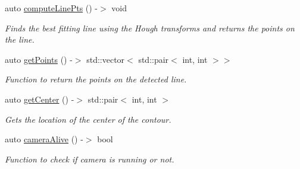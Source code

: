 \begin{DoxyCompactItemize}
auto \hyperlink{class_perception_module_a85bf112d0310cbc6a3160e3ea24f201e}{compute\+Line\+Pts} () -\/$>$ void
\begin{DoxyCompactList}\small\item\em Finds the best fitting line using the Hough transforms and returns the points on the line. \end{DoxyCompactList}\item 
auto \hyperlink{class_perception_module_a4479a449ea05c5490a47224767a864cc}{get\+Points} () -\/$>$ std\+::vector$<$ std\+::pair$<$ int, int $>$$>$
\begin{DoxyCompactList}\small\item\em Function to return the points on the detected line. \end{DoxyCompactList}\item 
auto \hyperlink{class_perception_module_ab39e9908fda8dd1b582b33a2f1ee0638}{get\+Center} () -\/$>$ std\+::pair$<$ int, int $>$
\begin{DoxyCompactList}\small\item\em Gets the location of the center of the contour. \end{DoxyCompactList}\item 
auto \hyperlink{class_perception_module_a034e0b3191be67f571aa284e0c30f749}{camera\+Alive} () -\/$>$ bool
\begin{DoxyCompactList}\small\item\em Function to check if camera is running or not. \end{DoxyCompactList}\end{DoxyCompactItemize}
